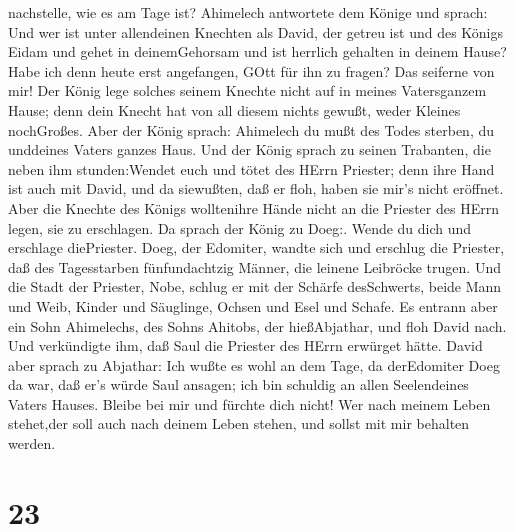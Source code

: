 nachstelle, wie es am Tage ist?  Ahimelech antwortete dem
Könige und sprach: Und wer ist unter allendeinen Knechten als David, der
getreu ist und des Königs Eidam und gehet in deinemGehorsam und ist
herrlich gehalten in deinem Hause?  Habe ich denn heute
erst angefangen, GOtt für ihn zu fragen? Das seiferne von mir! Der König
lege solches seinem Knechte nicht auf in meines Vatersganzem Hause; denn
dein Knecht hat von all diesem nichts gewußt, weder Kleines nochGroßes.
 Aber der König sprach: Ahimelech du mußt des Todes
sterben, du unddeines Vaters ganzes Haus.  Und der König
sprach zu seinen Trabanten, die neben ihm stunden:Wendet euch und tötet
des HErrn Priester; denn ihre Hand ist auch mit David, und da siewußten,
daß er floh, haben sie mir's nicht eröffnet. Aber die Knechte des Königs
wolltenihre Hände nicht an die Priester des HErrn legen, sie zu
erschlagen.  Da sprach der König zu Doeg:. Wende du dich
und erschlage diePriester. Doeg, der Edomiter, wandte sich und erschlug
die Priester, daß des Tagesstarben fünfundachtzig Männer, die leinene
Leibröcke trugen.  Und die Stadt der Priester, Nobe, schlug
er mit der Schärfe desSchwerts, beide Mann und Weib, Kinder und
Säuglinge, Ochsen und Esel und Schafe.  Es entrann aber ein
Sohn Ahimelechs, des Sohns Ahitobs, der hießAbjathar, und floh David
nach.  Und verkündigte ihm, daß Saul die Priester des HErrn
erwürget hätte.  David aber sprach zu Abjathar: Ich wußte
es wohl an dem Tage, da derEdomiter Doeg da war, daß er's würde Saul
ansagen; ich bin schuldig an allen Seelendeines Vaters Hauses.
 Bleibe bei mir und fürchte dich nicht! Wer nach meinem
Leben stehet,der soll auch nach deinem Leben stehen, und sollst mit mir
behalten werden.

\hypertarget{section-22}{%
\section{23}\label{section-22}}

